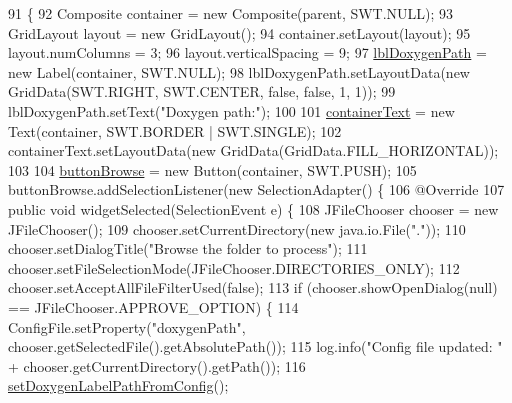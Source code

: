 \begin{DoxyCode}
91                                                 \{
92         Composite container = \textcolor{keyword}{new} Composite(parent, SWT.NULL);
93         GridLayout layout = \textcolor{keyword}{new} GridLayout();
94         container.setLayout(layout);
95         layout.numColumns = 3;
96         layout.verticalSpacing = 9;
97         \hyperlink{classit_1_1isislab_1_1masonhelperdocumentation_1_1mason_1_1wizards_1_1_b___project_information_page_a204ffc289609a627b90d6c31b2105c1b}{lblDoxygenPath} = \textcolor{keyword}{new} Label(container, SWT.NULL);
98         lblDoxygenPath.setLayoutData(\textcolor{keyword}{new} GridData(SWT.RIGHT, SWT.CENTER, \textcolor{keyword}{false}, \textcolor{keyword}{false}, 1, 1));
99         lblDoxygenPath.setText(\textcolor{stringliteral}{"Doxygen path:"});
100 
101         \hyperlink{classit_1_1isislab_1_1masonhelperdocumentation_1_1mason_1_1wizards_1_1_b___project_information_page_a0951101436c6e108b0dcbea4b8a5cfd7}{containerText} = \textcolor{keyword}{new} Text(container, SWT.BORDER | SWT.SINGLE);
102         containerText.setLayoutData(\textcolor{keyword}{new} GridData(GridData.FILL\_HORIZONTAL));
103 
104         \hyperlink{classit_1_1isislab_1_1masonhelperdocumentation_1_1mason_1_1wizards_1_1_b___project_information_page_ac64957cf0d484de5c9aec87db660cfb7}{buttonBrowse} = \textcolor{keyword}{new} Button(container, SWT.PUSH);
105         buttonBrowse.addSelectionListener(\textcolor{keyword}{new} SelectionAdapter() \{
106             @Override
107             \textcolor{keyword}{public} \textcolor{keywordtype}{void} widgetSelected(SelectionEvent e) \{
108                 JFileChooser chooser = \textcolor{keyword}{new} JFileChooser();
109                 chooser.setCurrentDirectory(\textcolor{keyword}{new} java.io.File(\textcolor{stringliteral}{"."}));
110                 chooser.setDialogTitle(\textcolor{stringliteral}{"Browse the folder to process"});
111                 chooser.setFileSelectionMode(JFileChooser.DIRECTORIES\_ONLY);
112                 chooser.setAcceptAllFileFilterUsed(\textcolor{keyword}{false});
113                 \textcolor{keywordflow}{if} (chooser.showOpenDialog(null) == JFileChooser.APPROVE\_OPTION) \{                  
114                     ConfigFile.setProperty(\textcolor{stringliteral}{"doxygenPath"}, chooser.getSelectedFile().getAbsolutePath());
115                     log.info(\textcolor{stringliteral}{"Config file updated: "} + chooser.getCurrentDirectory().getPath());
116                     \hyperlink{classit_1_1isislab_1_1masonhelperdocumentation_1_1mason_1_1wizards_1_1_b___project_information_page_a787830581d3746b970cde68fec9d59b3}{setDoxygenLabelPathFromConfig}();

\end{DoxyCode}
